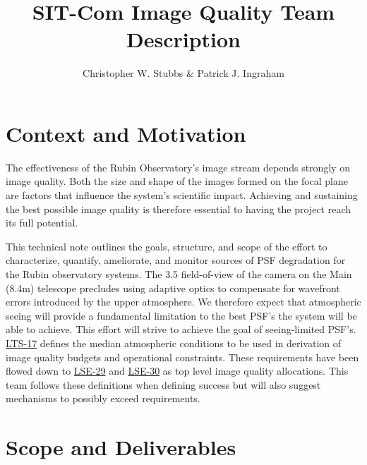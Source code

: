 \documentclass[SE,authoryear,toc]{lsstdoc}
\title{SIT-Com Image Quality Team Description}
\author{%
Christopher W. Stubbs
\&
Patrick J. Ingraham
}
\date{\vcsDate}
\begin{document}
\maketitle


\section{Context and Motivation}

The effectiveness of the Rubin Observatory's image stream depends strongly on image quality.
Both the size and shape of the images formed on the focal plane are factors that influence the system's scientific impact.
Achieving and sustaining the best possible image quality is therefore essential to having the project reach its full potential.

This technical note outlines the goals, structure, and scope of the effort to characterize, quantify, ameliorate, and monitor sources of PSF degradation for the Rubin observatory systems.
The {3.5\textdegree} field-of-view of the camera on the Main (8.4m) telescope precludes using adaptive optics to compensate for wavefront errors introduced by the upper atmosphere.
We therefore expect that atmospheric seeing will provide a fundamental limitation to the best PSF's the system will be able to achieve.
This effort will strive to achieve the goal of seeing-limited PSF's.
\href{https://ls.st/LPM-17}{LTS-17} defines the median atmospheric conditions to be used in derivation of image quality budgets and operational constraints.
These requirements have been flowed down to \href{https://ls.st/LSE-29}{LSE-29} and \href{https://ls.st/LSE-30}{LSE-30} as top level image quality allocations.
This team follows these definitions when defining success but will also suggest mechanisms to possibly exceed requirements.

\section{Scope and Deliverables}
\end{document}
